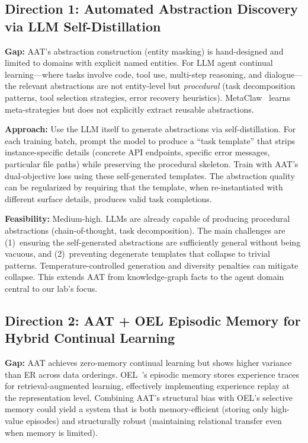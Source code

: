 \documentclass[11pt]{article}
\begin{document}
\subsection{Direction 1: Automated Abstraction Discovery via LLM Self-Distillation}

\textbf{Gap:} AAT's abstraction construction (entity masking) is hand-designed and limited to domains with explicit named entities. For LLM agent continual learning---where tasks involve code, tool use, multi-step reasoning, and dialogue---the relevant abstractions are not entity-level but \textit{procedural} (task decomposition patterns, tool selection strategies, error recovery heuristics). MetaClaw~\cite{metaclaw} learns meta-strategies but does not explicitly extract reusable abstractions.

\textbf{Approach:} Use the LLM itself to generate abstractions via self-distillation. For each training batch, prompt the model to produce a ``task template'' that strips instance-specific details (concrete API endpoints, specific error messages, particular file paths) while preserving the procedural skeleton. Train with AAT's dual-objective loss using these self-generated templates. The abstraction quality can be regularized by requiring that the template, when re-instantiated with different surface details, produces valid task completions.

\textbf{Feasibility:} Medium-high. LLMs are already capable of producing procedural abstractions (chain-of-thought, task decomposition). The main challenges are (1)~ensuring the self-generated abstractions are sufficiently general without being vacuous, and (2)~preventing degenerate templates that collapse to trivial patterns. Temperature-controlled generation and diversity penalties can mitigate collapse. This extends AAT from knowledge-graph facts to the agent domain central to our lab's focus.

\subsection{Direction 2: AAT + OEL Episodic Memory for Hybrid Continual Learning}

\textbf{Gap:} AAT achieves zero-memory continual learning but shows higher variance than ER across data orderings. OEL~\cite{oel}'s episodic memory stores experience traces for retrieval-augmented learning, effectively implementing experience replay at the representation level. Combining AAT's structural bias with OEL's selective memory could yield a system that is both memory-efficient (storing only high-value episodes) and structurally robust (maintaining relational transfer even when memory is limited).
\end{document}
